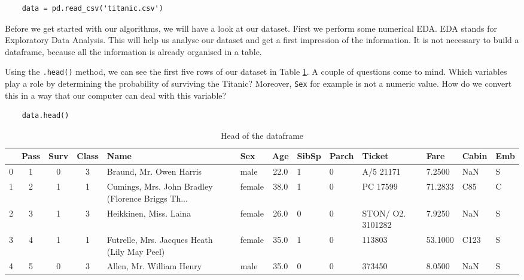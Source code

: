 \documentclass[11pt]{article}
\begin{document}
\begin{verbatim}
    data = pd.read_csv('titanic.csv')
\end{verbatim}

Before we get started with our algorithms, we will have a look at our dataset. First we perform some numerical EDA. EDA stands for Exploratory Data Analysis. This will help us analyse our dataset and get a first impression of the information. It is not necessary to build a dataframe, because all the information is already organised in a table. 

Using the \texttt{.head()} method, we can see the first five rows of our dataset in Table \ref{tab:table1}. A couple of questions come to
mind. Which variables play a role by determining the probability of surviving the Titanic? Moreover, \texttt{Sex} for example is not a numeric value. How do we convert this in a way that our computer can deal with this variable? 

\begin{verbatim}
    data.head()
\end{verbatim}

\begin{table}
\small
\begin{center}
\caption{\label{tab:table1}Head of the dataframe}
\begin{adjustwidth}{-2cm}{}
\begin{tabular}{|l|c|c|c|p{3cm}|l|c|p{1cm}|p{1cm}|p{1cm}|p{1cm}|l|p{0.5cm}|}
\toprule
\hline
{} &  Pass &  Surv &  Class &                                               Name &     Sex &   Age &  SibSp &  Parch &            Ticket &     Fare & Cabin & Emb \\
\midrule
\hline
 0 &            1 &         0 &       3 &                            Braund, Mr. Owen Harris &    male &  22.0 &      1 &      0 &         A/5 21171 &   7.2500 &   NaN &        S \\
 1 &            2 &         1 &       1 &  Cumings, Mrs. John Bradley (Florence Briggs Th... &  female &  38.0 &      1 &      0 &          PC 17599 &  71.2833 &   C85 &        C \\
 2 &            3 &         1 &       3 &                             Heikkinen, Miss. Laina &  female &  26.0 &      0 &      0 &  STON/ O2. 3101282 &   7.9250 &   NaN &        S \\
 3 &            4 &         1 &       1 &       Futrelle, Mrs. Jacques Heath (Lily May Peel) &  female &  35.0 &      1 &      0 &            113803 &  53.1000 &  C123 &        S \\
 4 &            5 &         0 &       3 &                           Allen, Mr. William Henry &    male &  35.0 &      0 &      0 &            373450 &   8.0500 &   NaN &        S \\
\bottomrule
\hline
\end{tabular}
\end{adjustwidth}
\end{center}
\end{table}
\end{document}
